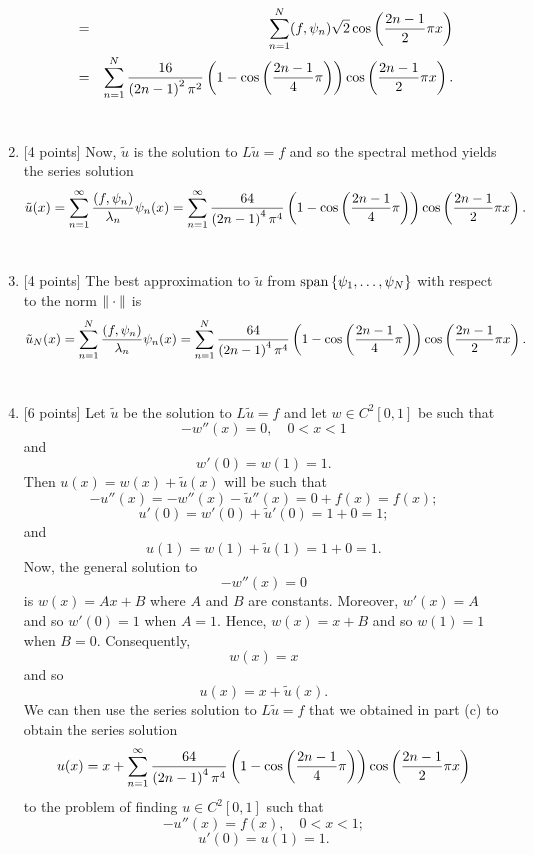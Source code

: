 \begin{solution}
\begin{enumerate}
\begin{eqnarray*}
\\
&=&\sum_{n=1}^N(f,\psi_n)\sqrt{2}\cos\left({2n-1\over 2}\pi x\right)
\\
&=&\sum_{n=1}^N{16\over \left(2n-1\right)^2\pi^2}\left(1-\cos\left({2n-1\over 4}\pi \right)\right)\cos\left({2n-1\over 2}\pi x\right).
\end{eqnarray*}
\\
\item {[4 points]} Now, $\tilde{u}$ is the solution to $L\tilde{u}=f$ and so the spectral method yields the series solution
\[
\tilde{u}(x)=\sum_{n=1}^\infty{(f,\psi_n)\over\lambda_n}\psi_n(x)=\sum_{n=1}^\infty{64\over \left(2n-1\right)^4\pi^4}\left(1-\cos\left({2n-1\over 4}\pi \right)\right)\cos\left({2n-1\over 2}\pi x\right).
\]
\\
\item {[4 points]} The best approximation to $\tilde{u}$ from ${\rm span}\left\{\psi_1,\ldots,\psi_N\right\}$ with respect to the norm $\|\cdot\|$ is
\[
\tilde{u}_N(x)=\sum_{n=1}^N{(f,\psi_n)\over\lambda_n}\psi_n(x)=\sum_{n=1}^N{64\over \left(2n-1\right)^4\pi^4}\left(1-\cos\left({2n-1\over 4}\pi \right)\right)\cos\left({2n-1\over 2}\pi x\right).
\]
\\
\item {[6 points]} Let $\tilde{u}$ be the solution to $L\tilde{u}=f$ and let $w\in C^2[0,1]$ be such that
\[
-w''(x)=0,\quad0<x<1
\]
and
\[
w'(0)=w(1)=1.
\]
Then $u(x)=w(x)+\tilde{u}(x)$ will be such that
\[
-u''(x)=-w''(x)-\tilde{u}''(x)=0+f(x)=f(x);
\]
\[
u'(0)=w'(0)+\tilde{u}'(0)=1+0=1;
\]
and
\[
u(1)=w(1)+\tilde{u}(1)=1+0=1.
\]
Now, the general solution to
\[
-w''(x)=0
\]
is $w(x)=Ax+B$ where $A$ and $B$ are constants. Moreover, $w'(x)=A$ and so $w'(0)=1$ when $A=1$. Hence, $w(x)=x+B$ and so $w(1)=1$ when $B=0$. Consequently,
\[
w(x)=x
\]
and so
\[
u(x)=x+\tilde{u}(x).
\]
We can then use the series solution to $L\tilde{u}=f$ that we obtained in part (c) to obtain the series solution
\[
u(x)=x+\sum_{n=1}^\infty{64\over \left(2n-1\right)^4\pi^4}\left(1-\cos\left({2n-1\over 4}\pi \right)\right)\cos\left({2n-1\over 2}\pi x\right)
\]
to the problem of finding $u\in C^2[0,1]$ such that
\[
-u''(x)=f(x),\quad0<x<1;
\]
\[
u'(0)=u(1)=1.
\]
\end{enumerate}
\end{solution}